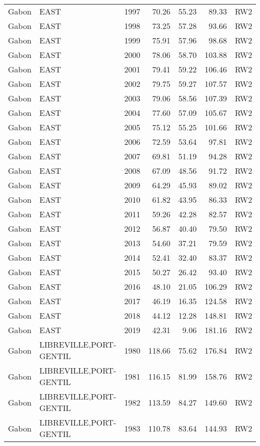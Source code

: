 \begin{longtable}{lllrrrl}
  Gabon & EAST & 1997 & 70.26 & 55.23 & 89.33 & RW2 \\ 
  Gabon & EAST & 1998 & 73.25 & 57.28 & 93.66 & RW2 \\ 
  Gabon & EAST & 1999 & 75.91 & 57.96 & 98.68 & RW2 \\ 
  Gabon & EAST & 2000 & 78.06 & 58.70 & 103.88 & RW2 \\ 
  Gabon & EAST & 2001 & 79.41 & 59.22 & 106.46 & RW2 \\ 
  Gabon & EAST & 2002 & 79.75 & 59.27 & 107.57 & RW2 \\ 
  Gabon & EAST & 2003 & 79.06 & 58.56 & 107.39 & RW2 \\ 
  Gabon & EAST & 2004 & 77.60 & 57.09 & 105.67 & RW2 \\ 
  Gabon & EAST & 2005 & 75.12 & 55.25 & 101.66 & RW2 \\ 
  Gabon & EAST & 2006 & 72.59 & 53.64 & 97.81 & RW2 \\ 
  Gabon & EAST & 2007 & 69.81 & 51.19 & 94.28 & RW2 \\ 
  Gabon & EAST & 2008 & 67.09 & 48.56 & 91.72 & RW2 \\ 
  Gabon & EAST & 2009 & 64.29 & 45.93 & 89.02 & RW2 \\ 
  Gabon & EAST & 2010 & 61.82 & 43.95 & 86.33 & RW2 \\ 
  Gabon & EAST & 2011 & 59.26 & 42.28 & 82.57 & RW2 \\ 
  Gabon & EAST & 2012 & 56.87 & 40.40 & 79.50 & RW2 \\ 
  Gabon & EAST & 2013 & 54.60 & 37.21 & 79.59 & RW2 \\ 
  Gabon & EAST & 2014 & 52.41 & 32.40 & 83.37 & RW2 \\ 
  Gabon & EAST & 2015 & 50.27 & 26.42 & 93.40 & RW2 \\ 
  Gabon & EAST & 2016 & 48.10 & 21.05 & 106.29 & RW2 \\ 
  Gabon & EAST & 2017 & 46.19 & 16.35 & 124.58 & RW2 \\ 
  Gabon & EAST & 2018 & 44.12 & 12.28 & 148.81 & RW2 \\ 
  Gabon & EAST & 2019 & 42.31 & 9.06 & 181.16 & RW2 \\ 
  Gabon & LIBREVILLE,PORT-GENTIL & 1980 & 118.66 & 75.62 & 176.84 & RW2 \\ 
  Gabon & LIBREVILLE,PORT-GENTIL & 1981 & 116.15 & 81.99 & 158.76 & RW2 \\ 
  Gabon & LIBREVILLE,PORT-GENTIL & 1982 & 113.59 & 84.27 & 149.60 & RW2 \\ 
  Gabon & LIBREVILLE,PORT-GENTIL & 1983 & 110.78 & 83.64 & 144.93 & RW2 \\ 

\end{longtable}
